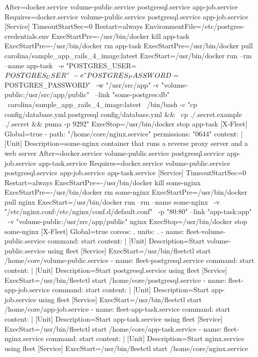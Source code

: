 \begin{codelisting}
\begin{code}
      After=docker.service volume-public.service postgresql.service 
            app-job.service
      Requires=docker.service volume-public.service postgresql.service 
               app-job.service
      [Service] 
      TimeoutStartSec=0
      Restart=always 
      EnvironmentFile=/etc/postgres-credentials.env
      ExecStartPre=-/usr/bin/docker kill app-task 
      ExecStartPre=-/usr/bin/docker rm app-task
      ExecStartPre=/usr/bin/docker pull carolina/sample_app_rails_4_image:latest 
      ExecStart=/usr/bin/docker run --rm --name app-task \
      -e "POSTGRES_USER=${POSTGRES_USER}" \
      -e "POSTGRES_PASSWORD=${POSTGRES_PASSWORD}" \
      -w "/usr/src/app" -v "volume-public:/usr/src/app/public" \
      --link "some-postgres:db" \
      carolina/sample_app_rails_4_image:latest \
      /bin/bash -c "cp config/database.yml.postgresql config/database.yml && \
      cp ./.secret.example ./.secret && puma -p 9292"
      ExecStop=/usr/bin/docker stop app-task
      [X-Fleet]
      Global=true
  - path: "/home/core/nginx.service"
    permissions: "0644"
    content: |
      [Unit] 
      Description=some-nginx container that runs a reverse proxy server and a 
                  web server
      After=docker.service volume-public.service postgresql.service 
            app-job.service app-task.service
      Requires=docker.service volume-public.service postgresql.service 
               app-job.service app-task.service
      [Service] 
      TimeoutStartSec=0
      Restart=always 
      ExecStartPre=-/usr/bin/docker kill some-nginx 
      ExecStartPre=-/usr/bin/docker rm some-nginx
      ExecStartPre=/usr/bin/docker pull nginx 
      ExecStart=/usr/bin/docker run --rm --name some-nginx \
      -v "/etc/nginx.conf:/etc/nginx/conf.d/default.conf" \
      -p "80:80" --link "app-task:app" \
      -v "volume-public:/usr/src/app/public" nginx 
      ExecStop=/usr/bin/docker stop some-nginx
      [X-Fleet]
      Global=true
coreos:
  .
  units:
  .
  - name: fleet-volume-public.service
    command: start
    content: |
      [Unit]
      Description=Start volume-public.service using fleet
      [Service]
      ExecStart=/usr/bin/fleetctl start /home/core/volume-public.service
  - name: fleet-postgresql.service
    command: start
    content: |
      [Unit]
      Description=Start postgresql.service using fleet
      [Service]
      ExecStart=/usr/bin/fleetctl start /home/core/postgresql.service
  - name: fleet-app-job.service
    command: start
    content: |
      [Unit]
      Description=Start app-job.service using fleet
      [Service]
      ExecStart=/usr/bin/fleetctl start /home/core/app-job.service
  - name: fleet-app-task.service
    command: start
    content: |
      [Unit]
      Description=Start app-task.service using fleet
      [Service]
      ExecStart=/usr/bin/fleetctl start /home/core/app-task.service
  - name: fleet-nginx.service
    command: start
    content: |
      [Unit]
      Description=Start nginx.service using fleet
      [Service]
      ExecStart=/usr/bin/fleetctl start /home/core/nginx.service
\end{code}
\end{codelisting}

